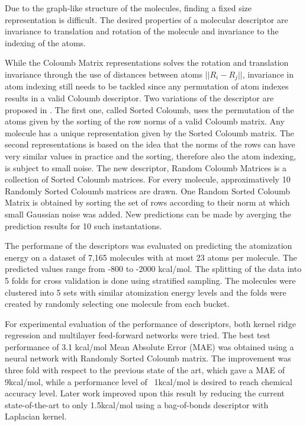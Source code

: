 \documentclass[10pt,journal,a4paper]{IEEEtran}
\begin{document}
Due to the graph-like structure of the molecules, finding a fixed size representation is difficult. The desired properties of a molecular descriptor are invariance to translation and rotation of the molecule and invariance to the indexing of the atoms.

While the Coloumb Matrix representations solves the rotation and translation invariance through the use of distances between atoms $||R_i -R_j||$, invariance in atom indexing still needs to be tackled since any permutation of atom indexes results in a valid Coloumb descriptor.
Two variations of the descriptor are proposed in \cite{montavon2012learning}. The first one, called Sorted Coloumb, uses the permutation of the atoms given by the sorting of the row norms of a valid Coloumb matrix. Any molecule has a unique representation given by the Sorted Coloumb matrix. The second representations is based on the idea that the norms of the rows can have very similar values in practice and the sorting, therefore also the atom indexing, is subject to small noise. The new descriptor, Random Coloumb Matrices is a collection of Sorted Coloumb matrices. For every molecule, approximatively 10 Randomly Sorted Coloumb matrices are drawn. One Random Sorted Coloumb Matrix is obtained by sorting the set of  rows according to their norm at which small Gaussian noise was added. New predictions can be made by averging the prediction results for 10 such instantations.

The performane of the descriptors was evaluated on predicting the atomization energy on a dataset of 7,165 molecules with at most 23 atoms per molecule. The predicted values range from -800 to -2000 kcal/mol. The splitting of the data into 5 folds for cross validation is done using stratified sampling. The molecules were clustered into 5 sets with similar atomization energy levels and the folds were created by randomly selecting one molecule from each bucket.

For experimental evaluation of the performance of descriptors, both kernel ridge regression and multilayer feed-forward networks were tried. The best test performance of 3.1 kcal/mol Mean Absolute Error (MAE) was obtained using a neural network with
 Randomly Sorted Coloumb matrix. The improvement was three fold with respect to the previous state of the art, which gave a MAE of 9kcal/mol, while a performance level of ~1kcal/mol is desired to reach chemical accuracy level.
Later work \cite{bob} improved upon this result by reducing the current state-of-the-art to only 1.5kcal/mol using a bag-of-bonds descriptor with Laplacian kernel.
\end{document}
